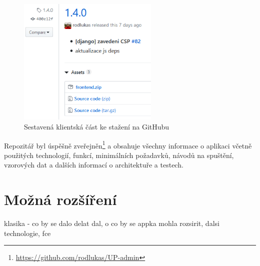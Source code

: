 \begin{figure}[h]\centering
    \includegraphics[width=0.6\textwidth]{img/gh.png}
    \caption{Sestavená klientská část ke stažení na GitHubu}\label{fig:gh}
\end{figure}

Repozitář byl úspěšně zveřejněn\footnote{\url{https://github.com/rodlukas/UP-admin}} a obsahuje všechny informace o aplikaci včetně použitých technologií, funkcí, minimálních požadavků, návodů na spuštění, vzorových dat a dalších informací o architektuře a testech.

\chapter{Možná rozšíření}
klasika - co by se dalo delat dal, o co by se appka mohla rozsirit, dalsi technologie, fce
